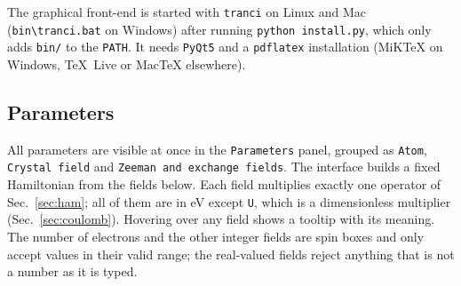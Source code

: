 \documentclass[11pt,a4paper]{article}
\newcommand{\op}[1]{\texttt{#1}}
\begin{document}
The graphical front-end is started with \op{tranci} on Linux and Mac
(\op{bin\textbackslash tranci.bat} on Windows) after running
\op{python install.py}, which only adds \op{bin/} to the \op{PATH}.  It needs
\op{PyQt5} and a \op{pdflatex} installation (MiKTeX on Windows, TeX~Live or
MacTeX elsewhere).

\subsection{Parameters}

All parameters are visible at once in the \op{Parameters} panel, grouped as
\op{Atom}, \op{Crystal field} and \op{Zeeman and exchange fields}.  The
interface builds a fixed Hamiltonian from the fields below.  Each field
multiplies exactly one operator of Sec.~\ref{sec:ham}; all of them are in eV
except \op{U}, which is a dimensionless multiplier (Sec.~\ref{sec:coulomb}).
Hovering over any field shows a tooltip with its meaning.  The number of
electrons and the other integer fields are spin boxes and only accept values in
their valid range; the real-valued fields reject anything that is not a number
as it is typed.
\end{document}
